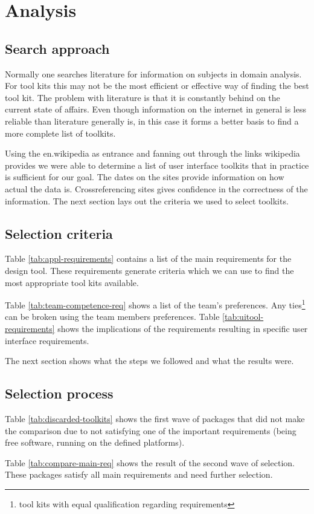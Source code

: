 \section{Analysis}

\subsection{Search approach}

Normally one searches literature for information on subjects in domain
analysis.  For tool kits this may not be the most efficient or effective way of
finding the best tool kit. The problem with literature is that it is constantly
behind on the current state of affairs. Even though information on the internet
in general is less reliable than literature generally is, in this case it forms
a better basis to find a more complete list of toolkits. 

Using the en.wikipedia as entrance and fanning out through the links wikipedia
provides we were able to determine a list of user interface toolkits that in
practice is sufficient for our goal. The dates on the sites provide information
on how actual the data is. Crossreferencing sites gives confidence in the
correctness of the information. The next section lays out the criteria we used
to select toolkits.

\subsection{Selection criteria}

Table \ref{tab:appl-requirements} contains a list of the main requirements for
the design tool. These requirements generate criteria which we can use to find
the most appropriate tool kits available.

Table \ref{tab:team-competence-req} shows a list of the team's preferences.
Any ties\footnote{tool kits with equal qualification regarding requirements}
can be broken using the team members preferences. Table
\ref{tab:uitool-requirements} shows the implications of the requirements
resulting in specific user interface requirements.

The next section shows what the steps we followed and what the results were.

\subsection{Selection process}

Table \ref{tab:discarded-toolkits} shows the first wave of packages that did
not make the comparison due to not satisfying one of the important requirements
(being free software, running on the defined platforms).

Table \ref{tab:compare-main-req} shows the result of the second wave of
selection. These packages satisfy all main requirements and need further
selection. 

